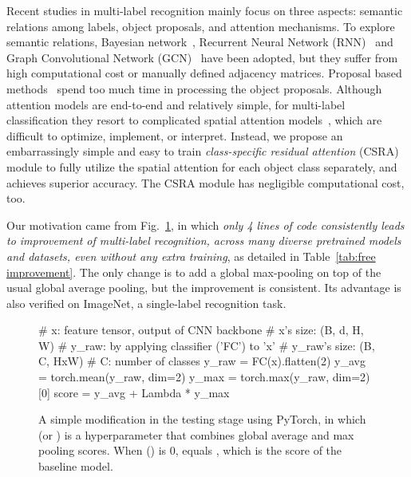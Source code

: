 \documentclass[10pt,twocolumn,letterpaper]{article}
\begin{document}
Recent studies in multi-label recognition mainly focus on three aspects: semantic relations among labels, object proposals, and attention mechanisms. To explore semantic relations, Bayesian network~\cite{2011_IJCAI_Markov,2016_CVPR_condition_graph}, Recurrent Neural Network (RNN)~\cite{2017_CVPR_RNN,2016_CVPR_RNNCNN} and Graph Convolutional Network (GCN)~\cite{2019_CVPR_GCN,2019_ICCV_GCNre} have been adopted, but they suffer from high computational cost or manually defined adjacency matrices. Proposal based methods~\cite{2015_PAMI_HCP,2016_ICIP_RCP,Wider} spend too much time in processing the object proposals. Although attention models are end-to-end and relatively simple, for multi-label classification they resort to complicated spatial attention models~\cite{2018_ECCV_CAM,2017_CVPR_SRN,2020_arxiv_Gaobb}, which are difficult to optimize, implement, or interpret. Instead, we propose an embarrassingly simple and easy to train \emph{class-specific residual attention} (CSRA) module to fully utilize the spatial attention for each object class separately, and achieves superior accuracy. The CSRA module has negligible computational cost, too.

Our motivation came from Fig.~\ref{fig:pytorch code}, in which \emph{only 4 lines of code consistently leads to improvement of multi-label recognition, across many diverse pretrained models and datasets, even \emph{without} any extra training}, as detailed in Table~\ref{tab:free improvement}. The only change is to add a global max-pooling on top of the usual global average pooling, but the improvement is consistent. Its advantage is also verified on ImageNet, a single-label recognition task.

\begin{figure}
\begin{python}
  # x: feature tensor, output of CNN backbone
  # x's size: (B, d, H, W)
  # y_raw: by applying classifier ('FC') to 'x'
  # y_raw's size: (B, C, HxW)
  # C: number of classes
  y_raw = FC(x).flatten(2)
  y_avg = torch.mean(y_raw, dim=2)
  y_max = torch.max(y_raw, dim=2)[0]
  score = y_avg + Lambda * y_max
\end{python} \caption{A simple modification in the testing stage using PyTorch, in which  (or ) is a hyperparameter that combines global average and max pooling scores. When  () is 0,  equals , which is the score of the baseline model.}
\label{fig:pytorch code}
\end{figure}
\end{document}
